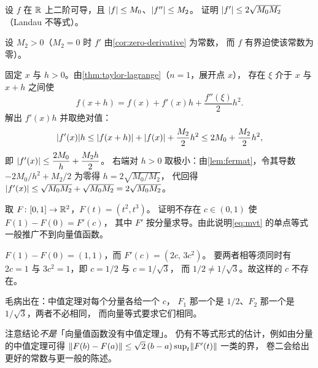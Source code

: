 \begin{exercise}[结构]
  \label{exr:landau}
  设 \(f\) 在 \(\mathbb{R}\) 上二阶可导，且 \(\lvert f\rvert \le M_{0}\)、\(\lvert f''\rvert \le M_{2}\)。
  证明 \(\lvert f'\rvert \le 2\sqrt{M_{0}M_{2}}\)（Landau 不等式）。
  \begin{solution}
    设 \(M_{2}>0\)（\(M_{2}=0\) 时 \(f'\) 由\cref{cor:zero-derivative} 为常数，
    而 \(f\) 有界迫使该常数为零）。

    固定 \(x\) 与 \(h>0\)。由\cref{thm:taylor-lagrange}（\(n=1\)，展开点 \(x\)），
    存在 \(\xi\) 介于 \(x\) 与 \(x+h\) 之间使
    \[
      f(x+h) = f(x) + f'(x)h + \frac{f''(\xi)}{2}h^{2} .
    \]
    解出 \(f'(x)h\) 并取绝对值：
    \[
      \lvert f'(x)\rvert h \le \lvert f(x+h)\rvert + \lvert f(x)\rvert + \frac{M_{2}}{2}h^{2}
        \le 2M_{0} + \frac{M_{2}}{2}h^{2} ,
    \]
    即 \(\lvert f'(x)\rvert \le \dfrac{2M_{0}}{h} + \dfrac{M_{2}h}{2}\)。
    右端对 \(h>0\) 取极小：由\cref{lem:fermat}，令其导数
    \(-2M_{0}/h^{2} + M_{2}/2\) 为零得 \(h = 2\sqrt{M_{0}/M_{2}}\)，
    代回得 \(\lvert f'(x)\rvert \le \sqrt{M_{0}M_{2}} + \sqrt{M_{0}M_{2}} = 2\sqrt{M_{0}M_{2}}\)。
  \end{solution}
\end{exercise}

\begin{exercise}[延伸]
  \label{exr:vector-mvt}
  取 \(F \colon [0,1] \to \mathbb{R}^{2}\)，\(F(t)=(t^{2},t^{3})\)。
  证明不存在 \(c \in (0,1)\) 使 \(F(1)-F(0) = F'(c)\)，
  其中 \(F'\) 按分量求导。由此说明\cref{eq:mvt} 的单点等式一般推广不到向量值函数。
  \begin{solution}
    \(F(1)-F(0) = (1,1)\)，而 \(F'(c) = (2c,\,3c^{2})\)。
    要两者相等须同时有 \(2c=1\) 与 \(3c^{2}=1\)，即 \(c=1/2\) 与 \(c=1/\sqrt3\)，
    而 \(1/2 \neq 1/\sqrt3\)。故这样的 \(c\) 不存在。

    毛病出在：中值定理对每个分量各给一个 \(c\)，
    \(F_{1}\) 那一个是 \(1/2\)、\(F_{2}\) 那一个是 \(1/\sqrt3\)，两者不必相同，
    而向量等式要求它们相同。

    注意结论\emph{不是}「向量值函数没有中值定理」。
    仍有不等式形式的估计，例如由分量的中值定理可得
    \(\lVert F(b)-F(a)\rVert \le \sqrt{2}\,(b-a)\sup_{t}\lVert F'(t)\rVert\) 一类的界，
    卷二会给出更好的常数与更一般的陈述。
  \end{solution}
\end{exercise}

